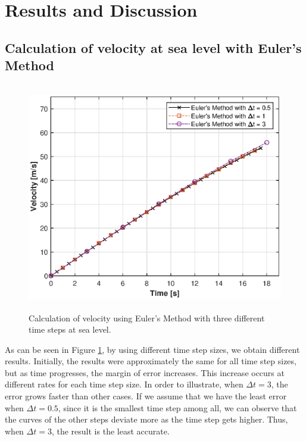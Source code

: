 \documentclass[letterpaper,12pt]{article}
\begin{document}
\newpage

\section{Results and Discussion}

\subsection{Calculation of velocity at sea level with Euler's Method }
\begin{figure}[ht]
\centering \includegraphics[max height=10cm]{graphs/question1.eps}
\caption{Calculation of velocity using Euler's Method with three different time steps at sea level.}
     \label{fig:q1}
\end{figure}

As can be seen in Figure \ref{fig:q1}, by using different time step sizes, we obtain different results.
Initially, the results were approximately the same for all time step sizes, but as time progresses, the margin of error increases.
This increase occurs at different rates for each time step size. In order to illustrate, when $ \Delta t = 3 $, the
error grows faster than other cases. If we assume that we have the least error when $ \Delta t = 0.5 $, since it is
the smallest time step among all, we can observe that the curves of the other steps deviate more as the time step gets
higher. Thus, when $ \Delta t = 3 $, the result is the least accurate.
\end{document}
